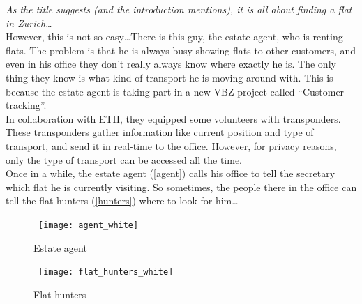 \emph{As the title suggests (and the introduction mentions), it is all about finding a flat in Zurich\ldots}\\

However, this is not so easy\ldots There is this guy, the estate agent, who is renting flats. The problem is that he is always busy showing flats to other customers, and even in his office they don't really always know where exactly he is. The only thing they know is what kind of transport he is moving around with. This is because the estate agent is taking part in a new VBZ-project called ``Customer tracking''.\\

In collaboration with ETH, they equipped some volunteers with transponders. These transponders gather information like current position and type of transport, and send it in real-time to the office. However, for privacy reasons, only the type of transport can be accessed all the time.\\

Once in a while, the estate agent (\autoref{agent}) calls his office to tell the secretary which flat he is currently visiting. So sometimes, the people there in the office can tell the flat hunters (\autoref{hunters}) where to look for him\ldots

\begin{figure}[h]
\centerline{\hbox{  
  \texttt{[image: agent\_white]}
  }}
\caption{Estate agent}
\label{agent}
\end{figure}

\begin{figure}[h]
  \centerline{\hbox{
    \texttt{[image: flat\_hunters\_white]}
  }}
\caption{Flat hunters}
\label{hunters}
\end{figure}
